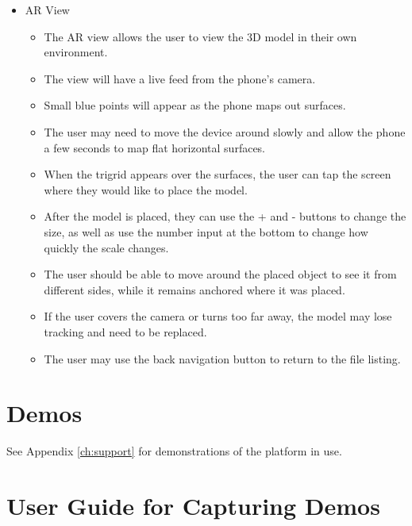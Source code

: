 \begin{itemize}
\begin{itemize}
    \end{itemize}
    \item AR View
    \begin{itemize}
        \item The AR view allows the user to view the 3D model in their own environment.
        \item The view will have a live feed from the phone's camera.
        \item Small blue points will appear as the phone maps out surfaces.
        \item The user may need to move the device around slowly and allow the phone a few seconds to map flat horizontal surfaces.
        \item When the trigrid appears over the surfaces, the user can tap the screen where they would like to place the model.
        \item After the model is placed, they can use the + and - buttons to change the size, as well as use the number input at the bottom to change how quickly the scale changes.
        \item The user should be able to move around the placed object to see it from different sides, while it remains anchored where it was placed.
        \item If the user covers the camera or turns too far away, the model may lose tracking and need to be replaced.
        \item The user may use the back navigation button to return to the file listing.
    \end{itemize}
\end{itemize}

\section{Demos}

See Appendix \ref{ch:support} for demonstrations of the platform in use. 

\section{User Guide for Capturing Demos}

